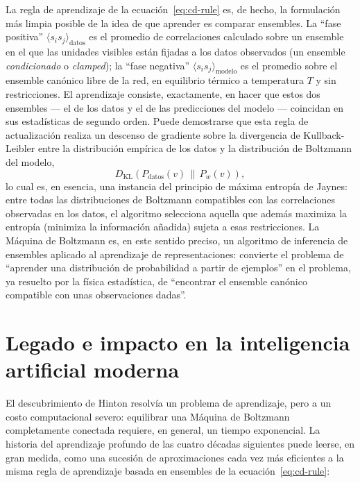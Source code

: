 \documentclass[12pt]{article}
\begin{document}
La regla de aprendizaje de la ecuación~\eqref{eq:cd-rule} es, de hecho, la formulación más limpia posible de la idea de que aprender es comparar ensembles. La ``fase positiva'' $\langle s_i s_j\rangle_{\text{datos}}$ es el promedio de correlaciones calculado sobre un ensemble en el que las unidades visibles están fijadas a los datos observados (un ensemble \emph{condicionado} o \emph{clamped}); la ``fase negativa'' $\langle s_i s_j\rangle_{\text{modelo}}$ es el promedio sobre el ensemble canónico libre de la red, en equilibrio térmico a temperatura $T$ y sin restricciones. El aprendizaje consiste, exactamente, en hacer que estos dos ensembles --- el de los datos y el de las predicciones del modelo --- coincidan en sus estadísticas de segundo orden. Puede demostrarse que esta regla de actualización realiza un descenso de gradiente sobre la divergencia de Kullback-Leibler entre la distribución empírica de los datos y la distribución de Boltzmann del modelo,
\begin{equation}
D_{\mathrm{KL}}\!\left(P_{\text{datos}}(v) \,\big\|\, P_w(v)\right),
\end{equation}
lo cual es, en esencia, una instancia del principio de máxima entropía de Jaynes: entre todas las distribuciones de Boltzmann compatibles con las correlaciones observadas en los datos, el algoritmo selecciona aquella que además maximiza la entropía (minimiza la información añadida) sujeta a esas restricciones. La Máquina de Boltzmann es, en este sentido preciso, un algoritmo de inferencia de ensembles aplicado al aprendizaje de representaciones: convierte el problema de ``aprender una distribución de probabilidad a partir de ejemplos'' en el problema, ya resuelto por la física estadística, de ``encontrar el ensemble canónico compatible con unas observaciones dadas''.

\section{Legado e impacto en la inteligencia artificial moderna}

El descubrimiento de Hinton resolvía un problema de aprendizaje, pero a un costo computacional severo: equilibrar una Máquina de Boltzmann completamente conectada requiere, en general, un tiempo exponencial. La historia del aprendizaje profundo de las cuatro décadas siguientes puede leerse, en gran medida, como una sucesión de aproximaciones cada vez más eficientes a la misma regla de aprendizaje basada en ensembles de la ecuación~\eqref{eq:cd-rule}:
\end{document}
